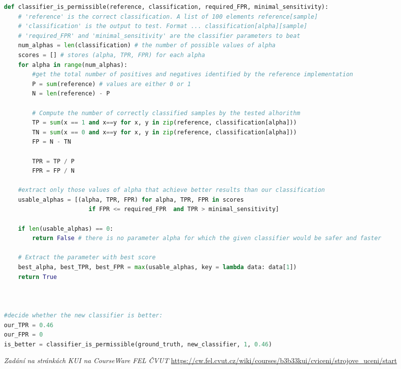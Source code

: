 \documentclass[twoside]{article}
\begin{document}
\begin{lstlisting}[language=Python]
	def classifier_is_permissible(reference, classification, required_FPR, minimal_sensitivity):
	# 'reference' is the correct classification. A list of 100 elements reference[sample]
	# 'classification' is the output to test. Format ... classification[alpha][sample]
	# 'required_FPR' and 'minimal_sensitivity' are the classifier parameters to beat
	num_alphas = len(classification) # the number of possible values of alpha
	scores = [] # stores (alpha, TPR, FPR) for each alpha
	for alpha in range(num_alphas):
		#get the total number of positives and negatives identified by the reference implementation
		P = sum(reference) # values are either 0 or 1
		N = len(reference) - P

		# Compute the number of correctly classified samples by the tested alhorithm
		TP = sum(x == 1 and x==y for x, y in zip(reference, classification[alpha]))
		TN = sum(x == 0 and x==y for x, y in zip(reference, classification[alpha]))
		FP = N - TN

		TPR = TP / P
		FPR = FP / N

	#extract only those values of alpha that achieve better results than our classification
	usable_alphas = [(alpha, TPR, FPR) for alpha, TPR, FPR in scores
	                    if FPR <= required_FPR  and TPR > minimal_sensitivity]

	if len(usable_alphas) == 0:
		return False # there is no parameter alpha for which the given classifier would be safer and faster

	# Extract the parameter with best score
	best_alpha, best_TPR, best_FPR = max(usable_alphas, key = lambda data: data[1])
	return True



#decide whether the new classifier is better:
our_TPR = 0.46
our_FPR = 0
is_better = classifier_is_permissible(ground_truth, new_classifier, 1, 0.46)
\end{lstlisting}


\begin{thebibliography}{9}

	\emph{Zadání na stránkách KUI na CourseWare FEL ČVUT} \url{https://cw.fel.cvut.cz/wiki/courses/b3b33kui/cviceni/strojove_uceni/start}
\end{thebibliography}
\end{document}
